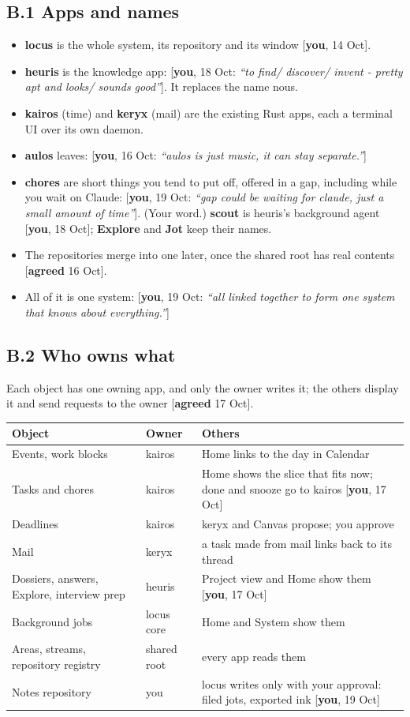\documentclass[10pt]{extarticle}
\newcommand{\you}[2]{{\small[\textbf{you}, #1: \textit{``#2''}]}}
\newcommand{\youx}[1]{{\small[\textbf{you}, #1]}}
\newcommand{\agreed}[1]{{\small[\textbf{agreed} #1]}}
\newcommand{\Sub}[1]{\subsection*{#1}}
\begin{document}
\Sub{B.1 Apps and names}
\begin{itemize}
\item \textbf{locus} is the whole system, its repository and its window \youx{14 Oct}.
\item \textbf{heuris} is the knowledge app: \you{18 Oct}{to find/ discover/ invent - pretty apt and looks/ sounds good}. It replaces the name nous.
\item \textbf{kairos} (time) and \textbf{keryx} (mail) are the existing Rust apps, each a terminal UI over its own daemon.
\item \textbf{aulos} leaves: \you{16 Oct}{aulos is just music, it can stay separate.}
\item \textbf{chores} are short things you tend to put off, offered in a gap, including while you wait on Claude: \you{19 Oct}{gap could be waiting for claude, just a small amount of time}. (Your word.) \textbf{scout} is heuris's background agent \youx{18 Oct}; \textbf{Explore} and \textbf{Jot} keep their names.
\item The repositories merge into one later, once the shared root has real contents \agreed{16 Oct}.
\item All of it is one system: \you{19 Oct}{all linked together to form one system that knows about everything.}
\end{itemize}

\Sub{B.2 Who owns what}
Each object has one owning app, and only the owner writes it; the others display it and send requests to the owner \agreed{17 Oct}.

\begin{tabularx}{\linewidth}{@{}l l Y@{}}
\toprule
Object & Owner & Others \\
\midrule
Events, work blocks & kairos & Home links to the day in Calendar \\
Tasks and chores & kairos & Home shows the slice that fits now; done and snooze go to kairos \youx{17 Oct} \\
Deadlines & kairos & keryx and Canvas propose; you approve \\
Mail & keryx & a task made from mail links back to its thread \\
Dossiers, answers, Explore, interview prep & heuris & Project view and Home show them \youx{17 Oct} \\
Background jobs & locus core & Home and System show them \\
Areas, streams, repository registry & shared root & every app reads them \\
Notes repository & you & locus writes only with your approval: filed jots, exported ink \youx{19 Oct} \\
\bottomrule
\end{tabularx}
\end{document}

